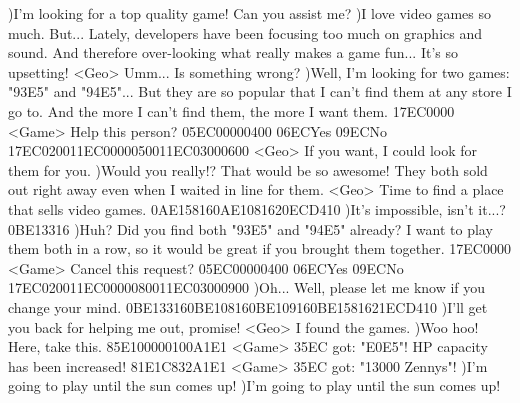 )I'm looking for a top quality game! Can you assist me? 
)I love video games so much. 
But... 
Lately, developers have been focusing too much on graphics and sound. 
And therefore over-looking what really makes a game fun... 
It's so upsetting! 
<Geo> Umm... 
Is something wrong? 
)Well, I'm looking for two games: "{93}{E5}" and "{94}{E5}"... 
But they are so popular that I can't find them at any store I go to. 
And the more I can't find them, the more I want them. 
{17}{EC}{00}{00} 
<Game> Help this person? {05}{EC}{00}{00}{04}{00}  {06}{EC}Yes   {09}{EC}No 
{17}{EC}{02}{00}{11}{EC}{00}{00}{05}{00}{11}{EC}{03}{00}{06}{00}
<Geo> If you want, I could look for them for you. 
)Would you really!? That would be so awesome! 
They both sold out right away even when I waited in line for them. 
<Geo> Time to find a place that sells video games. 
{0A}{E1}{58}{16}{0A}{E1}{08}{16}{20}{EC}{D4}{10}
)It's impossible, isn't it...? 
{0B}{E1}{33}{16}
)Huh? 
Did you find both "{93}{E5}" and "{94}{E5}" already? 
I want to play them both in a row, so it would be great if you brought them together. 
{17}{EC}{00}{00} 
<Game> Cancel this request? {05}{EC}{00}{00}{04}{00}  {06}{EC}Yes   {09}{EC}No 
{17}{EC}{02}{00}{11}{EC}{00}{00}{08}{00}{11}{EC}{03}{00}{09}{00}
)Oh... Well, please let me know if you change your mind. 
{0B}{E1}{33}{16}{0B}{E1}{08}{16}{0B}{E1}{09}{16}{0B}{E1}{58}{16}{21}{EC}{D4}{10}
)I'll get you back for helping me out, promise! 
<Geo> I found the games. 
)Woo hoo! Here, take this. 
{85}{E1}{00}{00}{01}{00}{A1}{E1} 
<Game> {35}{EC} got: "{E0}{E5}"! 
HP capacity has been increased! 
{81}{E1}{C8}{32}{A1}{E1} 
<Game> {35}{EC} got: "13000 Zennys"! 
)I'm going to play until the sun comes up! 
)I'm going to play until the sun comes up! 
